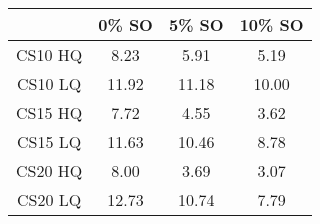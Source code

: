 \begin{table}[ht]
\begin{center}
\begin{tabular*}{0.4\textwidth}{@{\extracolsep{\fill}}cccc}%
  \hline
 & 0\% SO & 5\% SO & 10\% SO \\
  \hline
 \small{CS10 HQ} & \small{8.23} & \small{5.91} & \small{5.19} \\
 \small{CS10 LQ} & \small{11.92} & \small{11.18} & \small{10.00} \\
 \small{CS15 HQ} & \small{7.72} & \small{4.55} & \small{3.62} \\
 \small{CS15 LQ} & \small{11.63} & \small{10.46} & \small{8.78} \\
 \small{CS20 HQ} & \small{8.00} & \small{3.69} & \small{3.07} \\
 \small{CS20 LQ} & \small{12.73} & \small{10.74} & \small{7.79} \\
   \hline
\end{tabular*}
\end{center}
\end{table}
